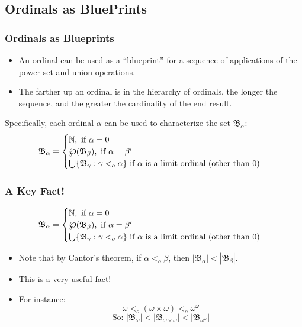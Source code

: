 \subsection{Ordinals as BluePrints}

\begin{frame}
\frametitle{Ordinals as Blueprints}

\begin{itemize}[<+->]

\item An ordinal can be used as a ``blueprint'' for a sequence of applications of the power set and union operations. 

\item The farther up an ordinal is in the hierarchy of ordinals, the longer the sequence, and the greater the cardinality of the end result.

\end{itemize}

Specifically, each ordinal $\alpha$ can be used to characterize the set $\mathfrak{B}_\alpha$:
\[
\mathfrak{B}_\alpha=
\begin{cases}
\mathbb{N}, \text{ if $\alpha = 0$}\\
\powerset(\mathfrak{B}_\beta), \text{ if $\alpha = \beta'$}\\
\bigcup \{\mathfrak{B}_\gamma : \gamma <_o \alpha\} \text{ if $\alpha$ is a limit ordinal (other than 0)}
\end{cases}
\]

\end{frame}

\begin{frame}
\frametitle{A Key Fact!}

\[
\mathfrak{B}_\alpha=
\begin{cases}
\mathbb{N}, \text{ if $\alpha = 0$}\\
\powerset(\mathfrak{B}_\beta), \text{ if $\alpha = \beta'$}\\
\bigcup \{\mathfrak{B}_\gamma : \gamma <_o \alpha\} \text{ if $\alpha$ is a limit ordinal (other than 0)}
\end{cases}
\]

\begin{itemize}[<+->]

\item Note that by Cantor's theorem, if $\alpha <_o \beta$, then $|\mathfrak{B}_\alpha| < |\mathfrak{B}_\beta|$.

\item This is a very useful fact!

\item For instance: 
\pause
$$\omega <_o (\omega \times \omega) <_o \omega^\omega$$
\pause
$$ \text{So: } |\mathfrak{B}_{\omega}| < |\mathfrak{B}_{\omega \times \omega}| < |\mathfrak{B}_{\omega^\omega}| $$



\end{itemize}
\end{frame}

